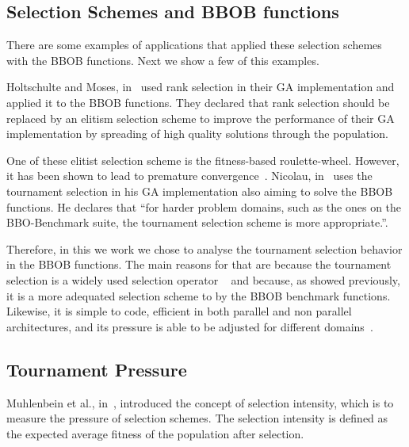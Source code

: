 \subsection{Selection Schemes and BBOB functions}

There are some examples of applications that applied these selection schemes with the BBOB functions. Next we show a few of this examples.

Holtschulte and Moses, in~\cite{holtschulte2013benchmarking} used rank selection in their GA implementation and applied it to the BBOB functions. They declared that rank selection should be replaced by an elitism selection scheme to improve the performance of their GA implementation by spreading of high quality solutions through the population. 

One of these elitist selection scheme is the fitness-based roulette-wheel. However, it has been shown to lead to premature convergence~\cite{baker1987reducing}. Nicolau, in~\cite{nicolau2009application} uses the tournament selection in his GA implementation also aiming to solve the BBOB functions. He declares that ``for harder problem domains, such as the ones on the BBO-Benchmark suite, the tournament selection scheme is more appropriate.''.

Therefore, in this we work we chose to analyse the tournament selection behavior in the BBOB functions. The main reasons for that are because the tournament selection is a widely used selection operator ~\cite{goldberg1991real, goldberg1993toward, agrawal1995simulated, harik1999gambler, tsutsui1999multi, harik1999compact, deb2000efficient, beyer2001self,kaelo2007integrated, bhunia2009application,  nicolau2009application, sawyerr2011comparative, ecta14, sawyerr2015benchmarking} and because, as showed previously, it is a more adequated selection scheme to by the BBOB benchmark functions. Likewise, it is simple to code, efficient in both parallel and non parallel architectures, and its pressure is able to be adjusted for different domains~\cite{miller1995genetic}.



\subsection{Tournament Pressure}\label{sec:background:tournament_pressure} 
Muhlenbein et al., in~\cite{muhlenbein1993predictive}, introduced the concept of selection intensity, which is to measure the pressure of selection schemes. The selection intensity is defined as the expected average fitness of the population after selection. 

